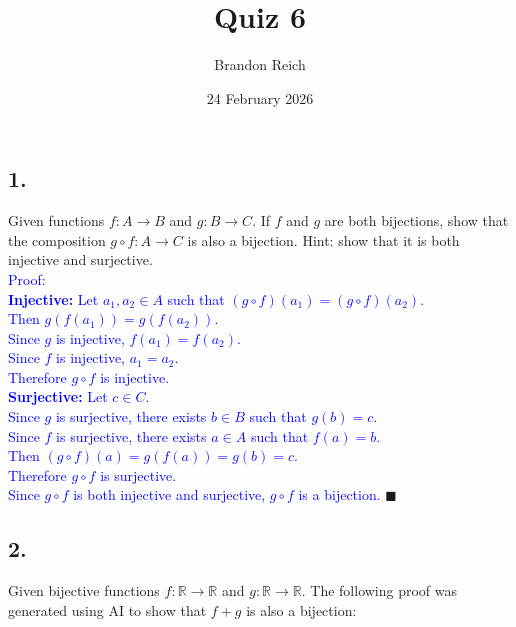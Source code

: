 \documentclass{article}
\title{Quiz 6}
\author{Brandon Reich}
\date{24 February 2026}
\begin{document}
\maketitle

\subsection*{1.}
Given functions $f: A \rightarrow B$ and $g: B \rightarrow C$. If $f$ and $g$ are both bijections, show that the composition $g \circ f: A \rightarrow C$ is also a bijection. Hint: show that it is both injective and surjective. \\[1em]
\textcolor{blue}{Proof:} \\[0.5em]
\textcolor{blue}{\textbf{Injective:} Let $a_1, a_2 \in A$ such that $(g \circ f)(a_1) = (g \circ f)(a_2)$.} \\
\textcolor{blue}{Then $g(f(a_1)) = g(f(a_2))$.} \\
\textcolor{blue}{Since $g$ is injective, $f(a_1) = f(a_2)$.} \\
\textcolor{blue}{Since $f$ is injective, $a_1 = a_2$.} \\
\textcolor{blue}{Therefore $g \circ f$ is injective.} \\[0.5em]
\textcolor{blue}{\textbf{Surjective:} Let $c \in C$.} \\
\textcolor{blue}{Since $g$ is surjective, there exists $b \in B$ such that $g(b) = c$.} \\
\textcolor{blue}{Since $f$ is surjective, there exists $a \in A$ such that $f(a) = b$.} \\
\textcolor{blue}{Then $(g \circ f)(a) = g(f(a)) = g(b) = c$.} \\
\textcolor{blue}{Therefore $g \circ f$ is surjective.} \\[0.5em]
\textcolor{blue}{Since $g \circ f$ is both injective and surjective, $g \circ f$ is a bijection.} $\blacksquare$

\subsection*{2.}
Given bijective functions $f: \mathbb{R} \rightarrow \mathbb{R}$ and $g: \mathbb{R} \rightarrow \mathbb{R}$. The following proof was generated using AI to show that $f + g$ is also a bijection:
\end{document}
